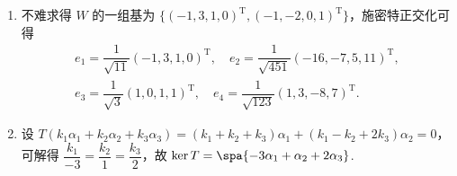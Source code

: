 \begin{enumerate}
    \[
        \begin{pmatrix}
            \frac{1}{2}(\lambda_1^n+\lambda_2^n) & 2(\lambda_1^{n-2} + \lambda_2^{n-2}) & -\frac{1}{2}(\lambda_1^n+\lambda_2^n) \\
            \frac{-\sqrt{5}}{5}(\lambda_1^n - \lambda_2^n) & \frac{-4\sqrt{5}}{5}(\lambda_1^{n-2} - \lambda_2^{n-2}) & \frac{\sqrt{5}}{5}(\lambda_1^n - \lambda_2^n) \\
            \frac{-3\sqrt{5}}{10}(\lambda_1^n - \lambda_2^n) & \frac{-6\sqrt{5}}{5}(\lambda_1^{n-2} - \lambda_2^{n-2}) & \frac{3\sqrt{5}}{10}(\lambda_1^n - \lambda_2^n)
        \end{pmatrix}
    \]
    从而可得 \[ B^n = \begin{pmatrix}
        1 & 0 & 0 & 0 & 0 \\
        -n & 1 & 0 & 0 & 0 \\
        0 & 0 & \frac{1}{2}(\lambda_1^n+\lambda_2^n) & 2(\lambda_1^{n-2} + \lambda_2^{n-2}) & -\frac{1}{2}(\lambda_1^n+\lambda_2^n) \\
        0 & 0 & \frac{-\sqrt{5}}{5}(\lambda_1^n - \lambda_2^n) & \frac{-4\sqrt{5}}{5}(\lambda_1^{n-2} - \lambda_2^{n-2}) & \frac{\sqrt{5}}{5}(\lambda_1^n - \lambda_2^n) \\
        0 & 0 & \frac{-3\sqrt{5}}{10}(\lambda_1^n - \lambda_2^n) & \frac{-6\sqrt{5}}{5}(\lambda_1^{n-2} - \lambda_2^{n-2}) & \frac{3\sqrt{5}}{10}(\lambda_1^n - \lambda_2^n)
    \end{pmatrix}. \] 其中 $\lambda_1 = 1+\sqrt{5}, \lambda_2 = 1-\sqrt{5}$.

    \item 不难求得 $W$ 的一组基为 $\{(-1, 3, 1, 0)^\mathrm{T}, (-1, -2, 0, 1)^\mathrm{T}\}$，施密特正交化可得
    \begin{gather*}
        e_1 = \dfrac{1}{\sqrt{11}}(-1, 3, 1, 0)^\mathrm{T},\quad e_2 = \dfrac{1}{\sqrt{451}}(-16,-7,5,11)^\mathrm{T}, \\
        e_3 = \dfrac{1}{\sqrt{3}}(1,0,1,1)^\mathrm{T},\quad e_4 = \dfrac{1}{\sqrt{123}}(1,3,-8,7)^\mathrm{T}.
    \end{gather*}

    \item 设 $T(k_1\alpha_1 + k_2\alpha_2 + k_3\alpha_3) = (k_1 + k_2 + k_3)\alpha_1 + (k_1 - k_2 + 2k_3)\alpha_2 = 0$，可解得 $\dfrac{k_1}{-3} = \dfrac{k_2}{1} = \dfrac{k_3}{2}$，故 $\ker T = \spa\{-3\alpha_1 + \alpha_2 + 2\alpha_3\}$.


\end{enumerate}
